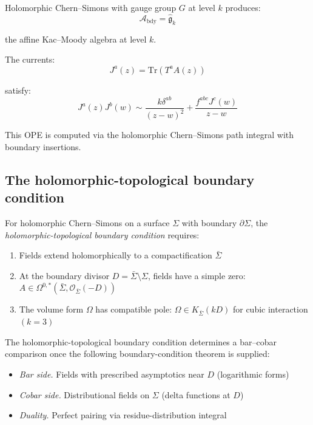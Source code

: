 \begin{example}
Holomorphic Chern--Simons with gauge group $G$ at level $k$ produces:
\[\mathcal{A}_{\text{bdy}} = \widehat{\mathfrak{g}}_k\]

the affine Kac--Moody algebra at level $k$.

The currents:
\[J^a(z) = \text{Tr}(T^a A(z))\]

satisfy:
\[J^a(z) J^b(w) \sim \frac{k \delta^{ab}}{(z-w)^2} +
\frac{f^{abc} J^c(w)}{z-w}\]

This OPE is computed via the holomorphic Chern--Simons path integral with
boundary insertions.
\end{example}

\subsection{The holomorphic-topological boundary condition}

\begin{definition}
For holomorphic Chern--Simons on a surface $\Sigma$ with boundary $\partial \Sigma$,
the \emph{holomorphic-topological boundary condition} requires:
\begin{enumerate}
\item Fields extend holomorphically to a compactification $\bar{\Sigma}$
\item At the boundary divisor $D = \bar{\Sigma} \setminus \Sigma$, fields have
a simple zero: $A \in \Omega^{0,*}(\bar{\Sigma}, \mathcal{O}_{\bar{\Sigma}}(-D))$
\item The volume form $\Omega$ has compatible pole: $\Omega \in K_{\bar{\Sigma}}(kD)$
for cubic interaction $(k=3)$
\end{enumerate}
\end{definition}

\begin{remark}
The holomorphic-topological boundary condition determines a bar--cobar
comparison once the following boundary-condition theorem is supplied:
\begin{itemize}
\item \emph{Bar side.} Fields with prescribed asymptotics near $D$ (logarithmic
forms)
\item \emph{Cobar side.} Distributional fields on $\Sigma$ (delta functions at $D$)
\item \emph{Duality.} Perfect pairing via residue-distribution integral
\end{itemize}
\end{remark}


